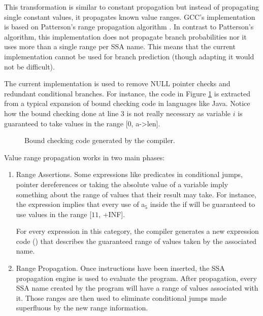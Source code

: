 This transformation is similar to constant propagation but
instead of propagating single constant values, it propagates
known value ranges.  GCC's implementation is based on Patterson's
range propagation algorithm \cite{novillo:bib:patterson-95}.  In
contrast to Patterson's algorithm, this implementation does not
propagate branch probabilities nor it uses more than a single
range per SSA name. This means that the current implementation
cannot be used for branch prediction (though adapting it would
not be difficult).

The current implementation is used to remove NULL pointer checks
and redundant conditional branches.  For instance, the code in
Figure \ref{novillo:fig:vrp-1} is extracted from a typical
expansion of bound checking code in languages like Java.
Notice how the bound checking done at line 3 is not really
necessary as variable $i$ is guaranteed to take values in the
range [$0$, a->len].

\begin{figure}
    \centering
    \parbox{2in}{}
    \caption{Bound checking code generated by the compiler.}
    \label{novillo:fig:vrp-1}
\end{figure}

Value range propagation works in two main phases:

\begin{enumerate}
\item	Range Assertions.  Some expressions like predicates in
	conditional jumps, pointer dereferences or taking the
	absolute value of a variable imply something about the
	range of values that their result may take.  For
	instance, the expression 
	implies that every use of a$_5$ inside the if will be
	guaranteed to use values in the range [$11$, +INF].

	For every expression in this category, the compiler
	generates a new expression code ()
	that describes the guaranteed range of values taken by
	the associated name.

\item	Range Propagation.  Once  instructions
	have been inserted, the SSA propagation engine is used to
	evaluate the program.  After propagation, every SSA name
	created by the program will have a range of values
	associated with it.  Those ranges are then used to
	eliminate conditional jumps made superfluous by the new
	range information.
\end{enumerate}

